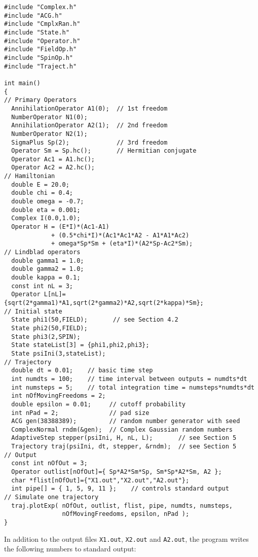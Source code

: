 \begin{verbatim}
#include "Complex.h"
#include "ACG.h"
#include "CmplxRan.h"
#include "State.h"
#include "Operator.h"
#include "FieldOp.h"
#include "SpinOp.h"
#include "Traject.h"

int main() 
{
// Primary Operators
  AnnihilationOperator A1(0);  // 1st freedom
  NumberOperator N1(0);
  AnnihilationOperator A2(1);  // 2nd freedom
  NumberOperator N2(1);
  SigmaPlus Sp(2);             // 3rd freedom
  Operator Sm = Sp.hc();       // Hermitian conjugate
  Operator Ac1 = A1.hc();
  Operator Ac2 = A2.hc();
// Hamiltonian
  double E = 20.0;           
  double chi = 0.4;      
  double omega = -0.7;       
  double eta = 0.001;
  Complex I(0.0,1.0);
  Operator H = (E*I)*(Ac1-A1)
             + (0.5*chi*I)*(Ac1*Ac1*A2 - A1*A1*Ac2)
             + omega*Sp*Sm + (eta*I)*(A2*Sp-Ac2*Sm);
// Lindblad operators
  double gamma1 = 1.0;       
  double gamma2 = 1.0;       
  double kappa = 0.1;        
  const int nL = 3;
  Operator L[nL]={sqrt(2*gamma1)*A1,sqrt(2*gamma2)*A2,sqrt(2*kappa)*Sm};
// Initial state
  State phi1(50,FIELD);       // see Section 4.2
  State phi2(50,FIELD);
  State phi3(2,SPIN);
  State stateList[3] = {phi1,phi2,phi3};
  State psiIni(3,stateList);
// Trajectory
  double dt = 0.01;    // basic time step                            
  int numdts = 100;    // time interval between outputs = numdts*dt  
  int numsteps = 5;    // total integration time = numsteps*numdts*dt
  int nOfMovingFreedoms = 2;
  double epsilon = 0.01;     // cutoff probability
  int nPad = 2;              // pad size
  ACG gen(38388389);         // random number generator with seed
  ComplexNormal rndm(&gen);  // Complex Gaussian random numbers
  AdaptiveStep stepper(psiIni, H, nL, L);       // see Section 5
  Trajectory traj(psiIni, dt, stepper, &rndm);  // see Section 5
// Output
  const int nOfOut = 3;
  Operator outlist[nOfOut]={ Sp*A2*Sm*Sp, Sm*Sp*A2*Sm, A2 };
  char *flist[nOfOut]={"X1.out","X2.out","A2.out"};
  int pipe[] = { 1, 5, 9, 11 };    // controls standard output
// Simulate one trajectory
  traj.plotExp( nOfOut, outlist, flist, pipe, numdts, numsteps,
                nOfMovingFreedoms, epsilon, nPad );
}
\end{verbatim}
In addition to the output files {\tt X1.out}, {\tt X2.out} and {\tt A2.out},
the program writes the following numbers to standard output:

